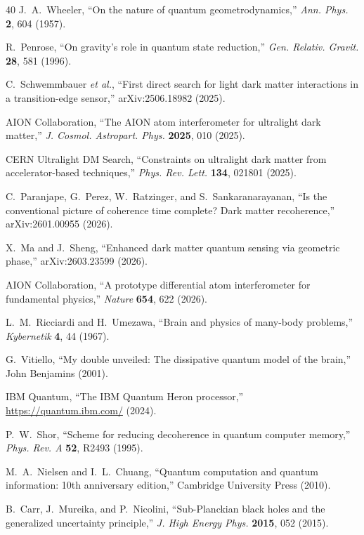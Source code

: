 ﻿\documentclass[12pt,a4paper]{article}
\begin{document}
\begin{thebibliography}{40}
J.~A.~Wheeler,
``On the nature of quantum geometrodynamics,''
\textit{Ann. Phys.} \textbf{2}, 604 (1957).

R.~Penrose,
``On gravity's role in quantum state reduction,''
\textit{Gen. Relativ. Gravit.} \textbf{28}, 581 (1996).

C.~Schwemmbauer \textit{et al.},
``First direct search for light dark matter interactions in a transition-edge sensor,''
arXiv:2506.18982 (2025).

AION Collaboration,
``The AION atom interferometer for ultralight dark matter,''
\textit{J. Cosmol. Astropart. Phys.} \textbf{2025}, 010 (2025).

CERN Ultralight DM Search,
``Constraints on ultralight dark matter from accelerator-based techniques,''
\textit{Phys. Rev. Lett.} \textbf{134}, 021801 (2025).

C.~Paranjape, G.~Perez, W.~Ratzinger, and S.~Sankaranarayanan,
``Is the conventional picture of coherence time complete? Dark matter recoherence,''
arXiv:2601.00955 (2026).

X.~Ma and J.~Sheng,
``Enhanced dark matter quantum sensing via geometric phase,''
arXiv:2603.23599 (2026).

AION Collaboration,
``A prototype differential atom interferometer for fundamental physics,''
\textit{Nature} \textbf{654}, 622 (2026).

L.~M.~Ricciardi and H.~Umezawa,
``Brain and physics of many-body problems,''
\textit{Kybernetik} \textbf{4}, 44 (1967).

G.~Vitiello,
``My double unveiled: The dissipative quantum model of the brain,''
John Benjamins (2001).

IBM Quantum,
``The IBM Quantum Heron processor,''
\url{https://quantum.ibm.com/} (2024).

P.~W.~Shor,
``Scheme for reducing decoherence in quantum computer memory,''
\textit{Phys. Rev. A} \textbf{52}, R2493 (1995).

M.~A.~Nielsen and I.~L.~Chuang,
``Quantum computation and quantum information: 10th anniversary edition,''
Cambridge University Press (2010).

B.~Carr, J.~Mureika, and P.~Nicolini,
``Sub-Planckian black holes and the generalized uncertainty principle,''
\textit{J. High Energy Phys.} \textbf{2015}, 052 (2015).


\end{thebibliography}
\end{document}
